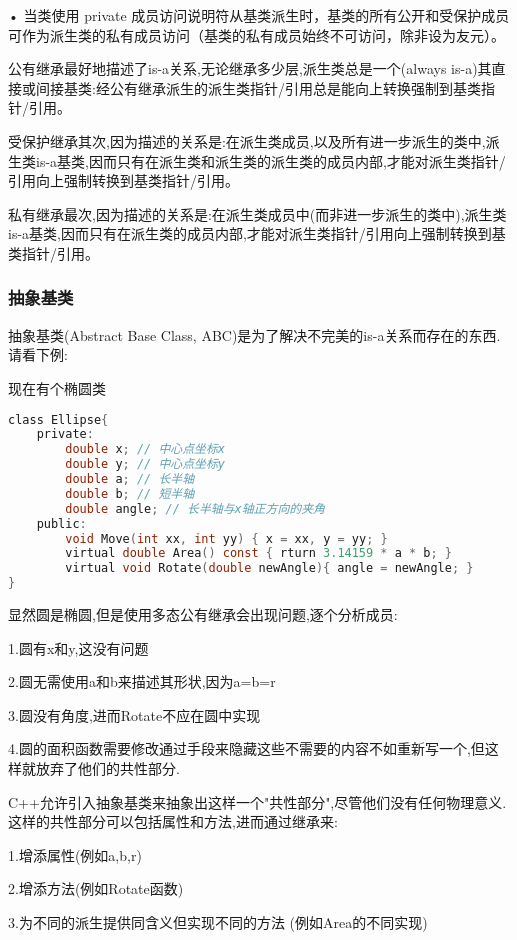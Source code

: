 \documentclass[UTF8]{ctexart}
\begin{document}
• 当类使用 private 成员访问说明符从基类派生时，基类的所有公开和受保护成员可作为派生类的私有成员访问（基类的私有成员始终不可访问，除非设为友元）。

公有继承最好地描述了is-a关系,无论继承多少层,派生类总是一个(always is-a)其直接或间接基类:经公有继承派生的派生类指针/引用总是能向上转换强制到基类指针/引用。

受保护继承其次,因为描述的关系是:在派生类成员,以及所有进一步派生的类中,派生类is-a基类,因而只有在派生类和派生类的派生类的成员内部,才能对派生类指针/引用向上强制转换到基类指针/引用。

私有继承最次,因为描述的关系是:在派生类成员中(而非进一步派生的类中),派生类is-a基类,因而只有在派生类的成员内部,才能对派生类指针/引用向上强制转换到基类指针/引用。

\subsubsection{抽象基类}
抽象基类(Abstract Base Class, ABC)是为了解决不完美的is-a关系而存在的东西.请看下例:

现在有个椭圆类
\begin{lstlisting}[language = C,basicstyle=\small\ttfamily]
class Ellipse{    
    private:        
        double x; // 中心点坐标x 
        double y; // 中心点坐标y   
        double a; // 长半轴       
        double b; // 短半轴       
        double angle; // 长半轴与x轴正方向的夹角    
    public:        
        void Move(int xx, int yy) { x = xx, y = yy; }  
        virtual double Area() const { rturn 3.14159 * a * b; }
        virtual void Rotate(double newAngle){ angle = newAngle; }
}
\end{lstlisting}

显然圆是椭圆,但是使用多态公有继承会出现问题,逐个分析成员:

1.圆有x和y,这没有问题

2.圆无需使用a和b来描述其形状,因为a=b=r

3.圆没有角度,进而Rotate不应在圆中实现

4.圆的面积函数需要修改通过手段来隐藏这些不需要的内容不如重新写一个,但这样就放弃了他们的共性部分.

C++允许引入抽象基类来抽象出这样一个"共性部分",尽管他们没有任何物理意义.这样的共性部分可以包括属性和方法,进而通过继承来:

1.增添属性(例如a,b,r)

2.增添方法(例如Rotate函数)

3.为不同的派生提供同含义但实现不同的方法
(例如Area的不同实现)
\end{document}
